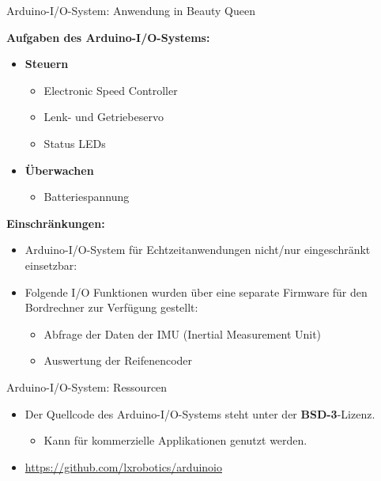 \documentclass{beamer}
\begin{document}
\begin{frame}{Arduino-I/O-System: Anwendung in Beauty Queen}
\begin{large}\textbf{Aufgaben des Arduino-I/O-Systems:}\end{large}
 \begin{itemize}
  \item \textbf{Steuern}
  \begin{itemize}
   \item Electronic Speed Controller
   \item Lenk- und Getriebeservo
   \item Status LEDs
  \end{itemize}
 \end{itemize}
 \begin{itemize}
  \item \textbf{\"Uberwachen}
  \begin{itemize}
   \item Batteriespannung
  \end{itemize}
 \end{itemize}
\begin{large}\textbf{Einschr\"ankungen:}\end{large}
\begin{itemize}
 \item Arduino-I/O-System f\"ur Echtzeitanwendungen nicht/nur eingeschr\"ankt einsetzbar: 
 \item Folgende I/O Funktionen wurden \"uber eine separate Firmware f\"ur den Bordrechner zur Verf\"ugung gestellt:
 \begin{itemize}
  \item Abfrage der Daten der IMU (Inertial Measurement Unit)
  \item Auswertung der Reifenencoder
 \end{itemize}
\end{itemize}
\end{frame}
\begin{frame}{Arduino-I/O-System: Ressourcen}
	\begin{itemize}
		\item Der Quellcode des Arduino-I/O-Systems steht unter der \textbf{BSD-3}-Lizenz.
		\begin{itemize}
			\item Kann f\"ur kommerzielle Applikationen genutzt werden.
		\end{itemize}
	\end{itemize}
	\begin{itemize}
		\item \url{https://github.com/lxrobotics/arduinoio}
	\end{itemize}
\end{frame}
\end{document}
